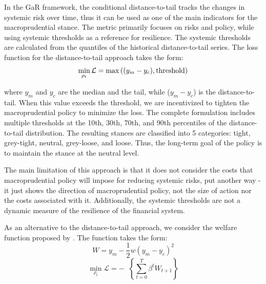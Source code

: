 \documentclass[12pt,a4paper]{article}
\begin{document}
In the GaR framework, the conditional distance-to-tail tracks the changes in systemic risk over time, thus it can be used as one of the main indicators for the macroprudential stance. The metric primarily focuses on risks and policy, while using systemic thresholds as a reference for resilience. The systemic thresholds are calculated from the quantiles of the historical distance-to-tail series. The loss function for the distance-to-tail approach takes the form:
\begin{equation}
    \label{eq:dt_loss}
    \min_{\rho_t}\mathcal{L} = \max{\left((y_m - y_c), \textnormal{threshold}\right)}
\end{equation}

where $y_m$ and $y_c$ are the median and the tail, while ($y_m-y_c$) is the distance-to-tail. When this value exceeds the threshold, we are incentivized to tighten the macroprudential policy to minimize the loss. The complete \citet{esrb2024} formulation includes multiple thresholds at the 10th, 30th, 70th, and 90th percentiles of the distance-to-tail distribution. The resulting stances are classified into 5 categories: tight, grey-tight, neutral, grey-loose, and loose. Thus, the long-term goal of the policy is to maintain the stance at the neutral level.

The main limitation of this approach is that it does not consider the costs that macroprudential policy will impose for reducing systemic risks, put another way - it just shows the direction of macroprudential policy, not the size of action nor the costs associated with it. Additionally, the systemic thresholds are not a dynamic measure of the resilience of the financial system. 

As an alternative to the distance-to-tail approach, we consider the welfare function proposed by \citet{suarez2022}. The function takes the form:
\begin{equation}
    \label{eq:suarez_W}
    W = y_m - \frac{1}{2}w\left(y_m - y_c\right)^2
\end{equation}
\begin{equation}
    \label{eq:suarez_loss}
    \min_{\rho_t}\mathcal{L} = -\mathop{\mathbb{E}_t}\left\{\sum_{t=0}^{T}\beta^tW_{t+1}\right\}
\end{equation}
\end{document}

